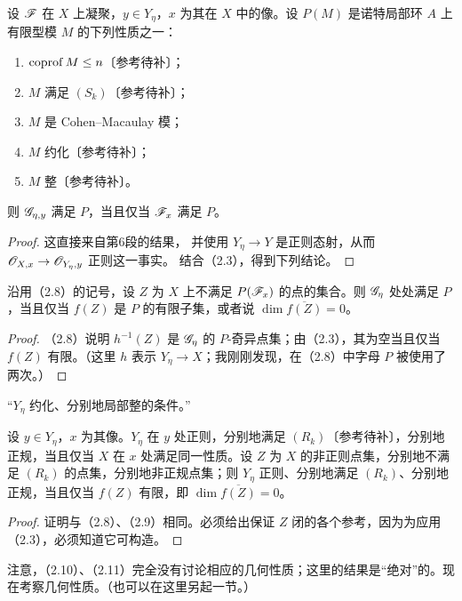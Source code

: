 设 $\mathscr F$ 在 $X$ 上凝聚，$y\in Y_\eta$，$x$ 为其在 $X$ 中的像。设 $P(M)$ 是诺特局部环 $A$ 上有限型模 $M$ 的下列性质之一：
\begin{enumerate}[label=(\roman*)]
\item $\operatorname{coprof} M\leq n$〔参考待补〕；
\item $M$ 满足 $(S_k)$〔参考待补〕；
\item $M$ 是 Cohen--Macaulay 模；
\item $M$ 约化〔参考待补〕；
\item $M$ 整〔参考待补〕。
\end{enumerate}
则 $\mathscr G_{\eta,y}$ 满足 $P$，当且仅当 $\mathscr F_x$ 满足 $P$。
\begin{proof}
这直接来自第6段的结果，
并使用 $Y_\eta\to Y$ 是正则态射，从而 $\mathscr O_{X,x}\to\mathscr O_{Y_\eta,y}$ 正则这一事实。
结合（2.3），得到下列结论。
\end{proof}

沿用（2.8）的记号，设 $Z$ 为 $X$ 上不满足 $P(\mathscr F_x)$ 的点的集合。则 $\mathscr G_\eta$ 处处满足 $P$，当且仅当 $f(Z)$ 是 $P$ 的有限子集，或者说 $\dim\overline{f(Z)}=0$。
\begin{proof}
（2.8）说明 $h^{-1}(Z)$ 是 $\mathscr G_\eta$ 的 $P$-奇异点集；由（2.3），其为空当且仅当 $f(Z)$ 有限。（这里 $h$ 表示 $Y_\eta\to X$；我刚刚发现，在（2.8）中字母 $P$ 被使用了两次。）
\end{proof}

“$Y_\eta$ 约化、分别地局部整的条件。”

设 $y\in Y_\eta$，$x$ 为其像。$Y_\eta$ 在 $y$ 处正则，分别地满足 $(R_k)$〔参考待补〕，分别地正规，当且仅当 $X$ 在 $x$ 处满足同一性质。设 $Z$ 为 $X$ 的非正则点集，分别地不满足 $(R_k)$ 的点集，分别地非正规点集；则 $Y_\eta$ 正则、分别地满足 $(R_k)$、分别地正规，当且仅当 $f(Z)$ 有限，即 $\dim\overline{f(Z)}=0$。
\begin{proof}
证明与（2.8）、（2.9）相同。必须给出保证 $Z$ 闭的各个参考，因为为应用（2.3），必须知道它可构造。
\end{proof}
注意，（2.10）、（2.11）完全没有讨论相应的几何性质；这里的结果是“绝对”的。现在考察几何性质。（也可以在这里另起一节。）

